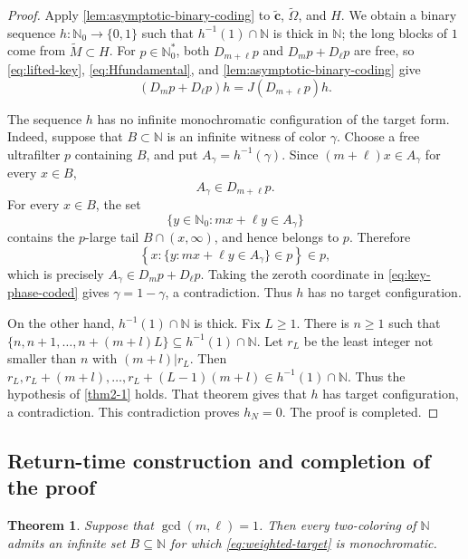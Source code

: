 \documentclass[reqno,12pt]{amsart}
\newtheorem{thm}{Theorem}[section]
\newcommand{\Nzero}{\mathbb N_0}
\newcommand{\Nstar}{\Nzero^{*}}
\def \N {\mathbb N}
\numberwithin{equation}{section}
\begin{document}
\begin{proof}
Apply \cref{lem:asymptotic-binary-coding} to
$\widetilde{\mathbf c}$, $\widetilde\Omega$, and $H$. We obtain a binary
sequence $h:\Nzero\to\{0,1\}$ such that $h^{-1}(1)\cap\N$ is thick in
$\N$; the long blocks of $1$ come from $\widetilde M\subset H$. For
$p\in\Nstar$, both $D_{m+\ell} p$ and $D_m p+D_\ell p$ are free, so
\eqref{eq:lifted-key}, \eqref{eq:Hfundamental}, and
\cref{lem:asymptotic-binary-coding} give
\begin{equation}\label{eq:key-phase-coded}
 (D_m p+D_\ell p)h=J(D_{m+\ell} p)h.
\end{equation}

The sequence $h$ has no infinite monochromatic configuration of the
target form. Indeed, suppose that $B\subset\N$ is an infinite witness of
color $\gamma$. Choose a free ultrafilter $p$ containing $B$, and put
$A_\gamma=h^{-1}(\gamma)$. Since $(m+\ell)x\in A_\gamma$ for every $x\in B$,
\[
 A_\gamma\in D_{m+\ell} p.
\]
For every $x\in B$, the set
\[
 \{y\in\Nzero:mx+\ell y\in A_\gamma\}
\]
contains the $p$-large tail $B\cap(x,\infty)$, and hence belongs to $p$.
Therefore
\[
 \left\{x:\{y:mx+\ell y\in A_\gamma\}\in p\right\}\in p,
\]
which is precisely $A_\gamma\in D_m p+D_\ell p$. Taking the zeroth
coordinate in \eqref{eq:key-phase-coded} gives
$\gamma=1-\gamma$, a contradiction. Thus $h$ has no target
configuration.

On the other hand, $h^{-1}(1)\cap\N$ is thick. Fix $L\geq1$. There is $n\geq1$
	such that
	$
	\{n,n+1,\ldots,n+(m+l)L\}\subseteq h^{-1}(1)\cap\N$.
	Let $r_L$ be the least integer not smaller than $n$ with $(m+l)|r_L$.  Then
	$
	r_L,r_L+(m+l),\ldots,r_L+(L-1)(m+l)\in h^{-1}(1)\cap\N.
	$
Thus the hypothesis of \cref{thm2-1} holds.  That theorem gives  that $h$ has target configuration, a contradiction.  This
contradiction proves
$h_N=0$. The proof is completed.
\end{proof}

\subsection{Return-time construction and completion of the proof}\label{sec:weighted-return}

\begin{thm}\label{thm:reduced}
Suppose that $\gcd(m,\ell)=1$.  Then every two-coloring of $\N$ admits an
infinite set $B\subseteq\N$ for which \eqref{eq:weighted-target} is
monochromatic.
\end{thm}
\end{document}
